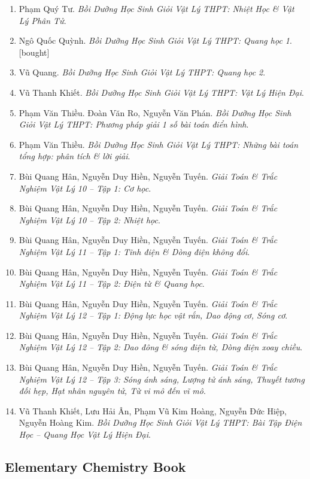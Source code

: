 \documentclass{article}
\begin{document}
\begin{enumerate}
	\item Phạm Quý Tư. \textit{Bồi Dưỡng Học Sinh Giỏi Vật Lý THPT: Nhiệt Học \& Vật Lý Phân Tử}.
	\item Ngô Quốc Quỳnh. \textit{Bồi Dưỡng Học Sinh Giỏi Vật Lý THPT: Quang học 1}.\hfill\textsf{[bought]}
	\item Vũ Quang. \textit{Bồi Dưỡng Học Sinh Giỏi Vật Lý THPT: Quang học 2}.
	\item Vũ Thanh Khiết. \textit{Bồi Dưỡng Học Sinh Giỏi Vật Lý THPT: Vật Lý Hiện Đại}.
	\item Phạm Văn Thiều. Đoàn Văn Ro, Nguyễn Văn Phán. \textit{Bồi Dưỡng Học Sinh Giỏi Vật Lý THPT: Phương pháp giải 1 số bài toán điển hình}.
	\item Phạm Văn Thiều. \textit{Bồi Dưỡng Học Sinh Giỏi Vật Lý THPT: Những bài toán tổng hợp: phân tích \& lời giải}.
	\item Bùi Quang Hân, Nguyễn Duy Hiền, Nguyễn Tuyến. \textit{Giải Toán \& Trắc Nghiệm Vật Lý 10 -- Tập 1: Cơ học}.
	\item Bùi Quang Hân, Nguyễn Duy Hiền, Nguyễn Tuyến. \textit{Giải Toán \& Trắc Nghiệm Vật Lý 10 -- Tập 2: Nhiệt học}.
	\item Bùi Quang Hân, Nguyễn Duy Hiền, Nguyễn Tuyến. \textit{Giải Toán \& Trắc Nghiệm Vật Lý 11 -- Tập 1: Tĩnh điện \& Dòng điện không đổi}.
	\item Bùi Quang Hân, Nguyễn Duy Hiền, Nguyễn Tuyến. \textit{Giải Toán \& Trắc Nghiệm Vật Lý 11 -- Tập 2: Điện từ \& Quang học}.
	\item Bùi Quang Hân, Nguyễn Duy Hiền, Nguyễn Tuyến. \textit{Giải Toán \& Trắc Nghiệm Vật Lý 12 -- Tập 1: Động lực học vật rắn, Dao động cơ, Sóng cơ}.
	\item Bùi Quang Hân, Nguyễn Duy Hiền, Nguyễn Tuyến. \textit{Giải Toán \& Trắc Nghiệm Vật Lý 12 -- Tập 2: Dao đông \& sóng điện từ, Dòng điện xoay chiều}.
	\item Bùi Quang Hân, Nguyễn Duy Hiền, Nguyễn Tuyến. \textit{Giải Toán \& Trắc Nghiệm Vật Lý 12 -- Tập 3: Sóng ánh sáng, Lượng tử ánh sáng, Thuyết tương đối hẹp, Hạt nhân nguyên tử, Từ vi mô đến vĩ mô}.
	\item Vũ Thanh Khiết, Lưu Hải Ân, Phạm Vũ Kim Hoàng, Nguyễn Đức Hiệp, Nguyễn Hoàng Kim. \textit{Bồi Dưỡng Học Sinh Giỏi Vật Lý THPT: Bài Tập Điện Học -- Quang Học Vật Lý Hiện Đại}.
\end{enumerate}

\subsection{Elementary Chemistry Book}
\end{document}
